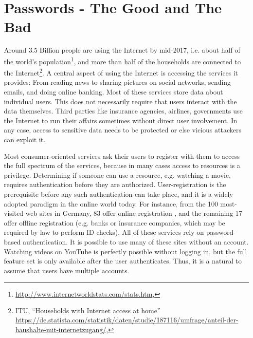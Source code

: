 \section{Passwords - The Good and The Bad}
Around 3.5 Billion people are using the Internet by mid-2017, i.e. about half of the world's population\footnote{\url{http://www.internetworldstats.com/stats.htm}, }, and more than half of the households are connected to the Internet\footnote{ITU, ``Households with Internet access at home'' \url{https://de.statista.com/statistik/daten/studie/187116/umfrage/anteil-der-haushalte-mit-internetzugang/}, }.	
A central aspect of using the Internet is accessing the services it provides: From reading news to sharing pictures on social networks, sending emails, and doing online banking. Most of these services store data about individual users. This does not necessarily require that users interact with the data themselves. Third parties like insurance agencies, airlines, governments use the Internet to run their affairs sometimes without direct user involvement. In any case, access to sensitive data needs to be protected or else vicious attackers can exploit it. 

Most consumer-oriented services ask their users to register with them to access the full spectrum of the services, because in many cases access to resources is a privilege. Determining if someone can use a resource, e.g. watching a movie, requires authentication before they are authorized. User-registration is the prerequisite before any such authentication can take place, and it is a widely adopted paradigm in the online world today. For instance, from the 100 most-visited web sites in Germany, 83 offer online registration \cite{Seitz2017PoliciesReuse}, and the remaining 17 offer offline registration (e.g. banks or insurance companies, which may be required by law to perform ID checks). All of these services rely on password-based authentication. It is possible to use many of these sites without an account. Watching videos on YouTube is perfectly possible without logging in, but the full feature set is only available after the user authenticates. Thus, it is a natural to assume that users have multiple accounts. 

